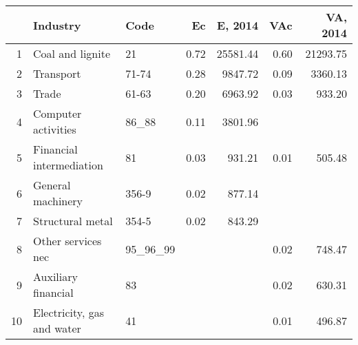 \begin{table}[ht]
\centering
\begin{tabular}{rllrrrr}
  \hline
 & Industry & Code & Ec & E, 2014 & VAc & VA, 2014 \\ 
  \hline
1 & Coal and lignite & 21 & 0.72 & 25581.44 & 0.60 & 21293.75 \\ 
  2 & Transport & 71-74 & 0.28 & 9847.72 & 0.09 & 3360.13 \\ 
  3 & Trade & 61-63 & 0.20 & 6963.92 & 0.03 & 933.20 \\ 
  4 & Computer activities & 86\_88 & 0.11 & 3801.96 &  &  \\ 
  5 & Financial intermediation & 81 & 0.03 & 931.21 & 0.01 & 505.48 \\ 
  6 & General machinery & 356-9 & 0.02 & 877.14 &  &  \\ 
  7 & Structural metal & 354-5 & 0.02 & 843.29 &  &  \\ 
  8 & Other services nec & 95\_96\_99 &  &  & 0.02 & 748.47 \\ 
  9 & Auxiliary financial & 83 &  &  & 0.02 & 630.31 \\ 
  10 & Electricity, gas and water & 41 &  &  & 0.01 & 496.87 \\ 
   \hline
\end{tabular}
\end{table}
